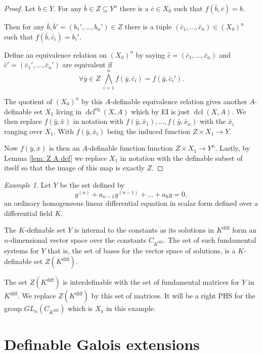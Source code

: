 \documentclass{amsart}
\theoremstyle{definition}
\theoremstyle{remark}
\newtheorem{example}[theorem]{Example}
\numberwithin{equation}{section}
\def \eq {\operatorname{eq}}
\def \diff {\operatorname{diff}}
\def \dcl {\operatorname{dcl}}
\begin{document}
\begin{proof}
    Let $b \in Y$. For any $\bar{b} \in Z \subseteq Y^n$ there is a $\bar{c} \in X_0$ such that $f(\bar{b},\bar{c}) = b$. 
    
    Then for any $\bar{b},\bar{b}' = (b_1',...,b_n') \in Z$ there is a tuple $(\bar{c}_1,...,\bar{c}_n) \in (X_0)^n$ such that $f(\bar{b},\bar{c}_i) = b_i'$. 
    
    Define an equivalence relation on $(X_0)^n$ by saying $\hat{c} = (\bar{c}_1,...,\bar{c}_n)$ and $\hat{c}' = (\bar{c}_1',...,\bar{c}_n')$ are equivalent if $$\forall \bar{y} \in Z  \ \bigwedge_{i = 1}^n f(\bar{y},\bar{c}_i) = f(\bar{y},\bar{c}_i').$$
    
    The quotient of $(X_0)^n$ by this $A$-definable equivalence relation gives another $A$-definable set $X_1$ living in $\dcl^{\eq}(X,A)$ which by EI is just $\dcl(X,A)$. We then replace $f(\bar{y}, \bar{x})$ in notation with $f(\bar{y}, \bar{x}_1),...,f(\bar{y}, \bar{x}_n)$ with the $\bar{x}_i$ ranging over $X_1$. With $f(\bar{y}, \bar{x}_i)$ being the induced function $Z\times X_1 \to Y$. 

    Now $f(\bar{y}, \bar{x})$ is then an $A$-definable function function $Z\times X_1 \to Y^n$. Lastly, by Lemma \ref{lem: Z A def} we replace $X_1$ in notation with the definable subset of itself so that the image of this map is exactly $Z$.
\end{proof}

\begin{example}
Let $Y$ be the set defined by $$y^{(n)} + a_{n-1}y^{(n-1)}+...+a_0y = 0,$$ an ordinary homogeneous linear differential equation in scalar form defined over a differential field $K$. 

The $K$-definable set $Y$ is internal to the constants as its solutions in $K^{\diff}$ form an $n$-dimensional vector space over the constants $C_{K^{\diff}}$. The set of such fundamental systems for $Y$ that is, the set of bases for the vector space of solutions, is a $K$-definable set $Z(K^{\diff})$. 

The set $Z(K^{\diff})$ is interdefinable with the set of fundamental matrices for $Y$ in $K^{\diff}$. We replace $Z(K^{\diff})$ by this set of matrices. It will be a right PHS for the group $GL_n(C_{K^{\diff}})$ which is $X_1$ in this example.
\end{example}

\section{Definable Galois extensions}\label{sec: def Gal th}
\end{document}
